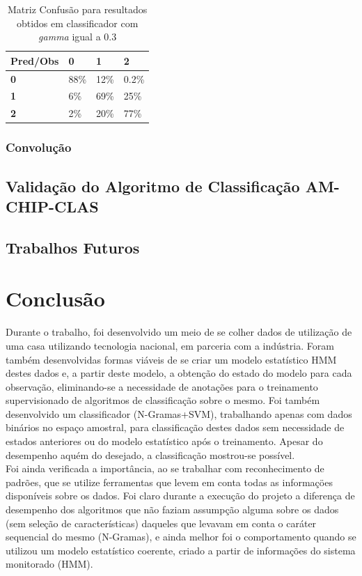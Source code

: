 \documentclass[
	12pt,				%
	openright,			%
	twoside,			%
	a4paper,			%
	english,			%
	spanish,			%
	brazil,				%
	]{abntex2}\usepackage[]{graphicx}\usepackage[]{color}
\begin{document}
\begin{table}[htb]
	\center
	\footnotesize
	\begin{tabular}{llll}
		\textbf{Pred/Obs} & \textbf{0}  & \textbf{1}  & \textbf{2} \\
		\hline
		\textbf{0} & 88\% & 12\% & 0.2\% \\
		\hline
		\textbf{1} & 6\% & 69\% & 25\% \\
		\hline
		\textbf{2} & 2\% & 20\% & 77\% \\
		\hline		
	\end{tabular}
	\caption{Matriz Confusão para resultados obtidos em classificador com \textit{gamma} igual a 0.3}
\end{table}


\subsection{Convolução}


\section{Validação do Algoritmo de Classificação AM-CHIP-CLAS}





\section{Trabalhos Futuros}

\chapter{Conclusão}

Durante o trabalho, foi desenvolvido um meio de se colher dados de utilização de uma casa utilizando tecnologia nacional, em parceria com a indústria. Foram também desenvolvidas formas viáveis de se criar um modelo estatístico HMM destes dados e, a partir deste modelo, a obtenção do estado do modelo para cada observação, eliminando-se a necessidade de anotações para o treinamento supervisionado de algoritmos de classificação sobre o mesmo. Foi também desenvolvido um classificador (N-Gramas+SVM), trabalhando apenas com dados binários no espaço amostral, para classificação destes dados sem necessidade de estados anteriores ou do modelo estatístico após o treinamento. Apesar do desempenho aquém do desejado, a classificação mostrou-se possível.\\
Foi ainda verificada a importância, ao se trabalhar com reconhecimento de padrões, que se utilize ferramentas que levem em conta todas as informaçöes disponíveis sobre os dados. Foi claro durante a execução do projeto a diferença de desempenho dos algoritmos que não faziam assumpção alguma sobre os dados (sem seleção de características) daqueles que levavam em conta o caráter sequencial do mesmo (N-Gramas), e ainda melhor foi o comportamento quando se utilizou um modelo estatístico coerente, criado a partir de informações do sistema monitorado (HMM). \\
\end{document}
